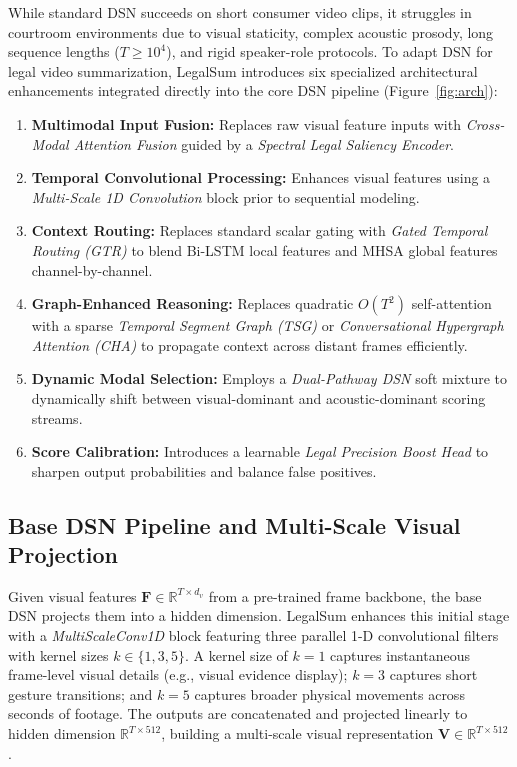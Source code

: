 \documentclass[letterpaper]{article}
\begin{document}
While standard DSN succeeds on short consumer video clips, it struggles in courtroom environments due to visual staticity, complex acoustic prosody, long sequence lengths ($T \ge 10^4$), and rigid speaker-role protocols. To adapt DSN for legal video summarization, LegalSum introduces six specialized architectural enhancements integrated directly into the core DSN pipeline (Figure~\ref{fig:arch}):
\begin{enumerate}
\item \textbf{Multimodal Input Fusion:} Replaces raw visual feature inputs with \textit{Cross-Modal Attention Fusion} guided by a \textit{Spectral Legal Saliency Encoder}.
\item \textbf{Temporal Convolutional Processing:} Enhances visual features using a \textit{Multi-Scale 1D Convolution} block prior to sequential modeling.
\item \textbf{Context Routing:} Replaces standard scalar gating with \textit{Gated Temporal Routing (GTR)} to blend Bi-LSTM local features and MHSA global features channel-by-channel.
\item \textbf{Graph-Enhanced Reasoning:} Replaces quadratic $O(T^2)$ self-attention with a sparse \textit{Temporal Segment Graph (TSG)} or \textit{Conversational Hypergraph Attention (CHA)} to propagate context across distant frames efficiently.
\item \textbf{Dynamic Modal Selection:} Employs a \textit{Dual-Pathway DSN} soft mixture to dynamically shift between visual-dominant and acoustic-dominant scoring streams.
\item \textbf{Score Calibration:} Introduces a learnable \textit{Legal Precision Boost Head} to sharpen output probabilities and balance false positives.
\end{enumerate}

\subsection{Base DSN Pipeline and Multi-Scale Visual Projection}

Given visual features $\mathbf{F} \in \mathbb{R}^{T \times d_v}$ from a pre-trained frame backbone, the base DSN projects them into a hidden dimension. LegalSum enhances this initial stage with a \textit{MultiScaleConv1D} block featuring three parallel 1-D convolutional filters with kernel sizes $k \in \{1, 3, 5\}$. A kernel size of $k=1$ captures instantaneous frame-level visual details (e.g., visual evidence display); $k=3$ captures short gesture transitions; and $k=5$ captures broader physical movements across seconds of footage. The outputs are concatenated and projected linearly to hidden dimension $\mathbb{R}^{T \times 512}$, building a multi-scale visual representation $\mathbf{V} \in \mathbb{R}^{T \times 512}$.
\end{document}
